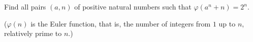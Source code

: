 \begin{problem}
    Find all pairs \( \left(a, n\right) \) of positive natural numbers such that \( \varphi \left( a^n + n \right) = 2^n \).

    (\( \varphi\left(n\right) \) is the Euler function, that is, the number of integers from \( 1 \) up to \( n \), relatively prime to \( n \).)
\end{problem}
